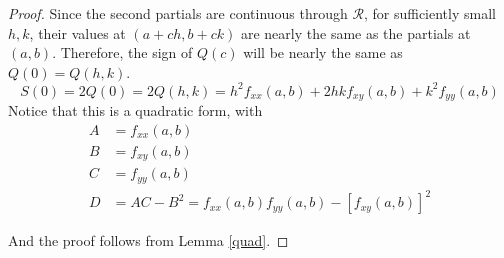 \documentclass[12pt]{article}
\begin{document}
\begin{proof}
Since the second partials are continuous through $\mathcal{R}$, for sufficiently small $h,k$, their values at $(a+ch,b+ck)$ are nearly the same as the partials at $(a,b)$. Therefore, the sign of $Q(c)$ will be nearly the same as $Q(0) = Q(h,k)$.
\[ S(0) = 2Q(0) = 2Q(h,k) = h^2f_{xx}(a,b) + 2hkf_{xy}(a,b) + k^2f_{yy}(a,b) \]
Notice that this is a quadratic form, with 
\[
\begin{aligned}
A &= f_{xx}(a,b) \\
B &= f_{xy}(a,b) \\
C &= f_{yy}(a,b) \\
D &= AC - B^2 = f_{xx}(a,b)f_{yy}(a,b) - [f_{xy}(a,b)]^2
\end{aligned}
\]

And the proof follows from Lemma \ref{quad}.
\end{proof}
\end{document}
